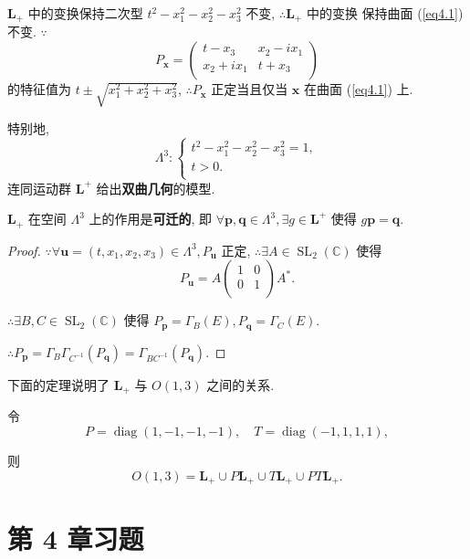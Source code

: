 \documentclass{ctexart}
\begin{document}
$\boldsymbol{L}_+$ 中的变换保持二次型 $t^2-x_1^2-x_2^2-x_3^2$ 不变, $\therefore\boldsymbol{L}_+$ 中的变换 保持曲面 (\ref{eq4.1}) 不变. $\because$
\[P_{\boldsymbol{x}}=\begin{pmatrix}
    t-x_3 & x_2-ix_1 \\
    x_2+ix_1 & t+x_3 \\
\end{pmatrix}\]
的特征值为 $t\pm\sqrt{x_1^2+x_2^2+x_3^2}$, $\therefore P_{\boldsymbol{x}}$ 正定当且仅当 $\boldsymbol{x}$ 在曲面 (\ref{eq4.1}) 上.

特别地, 
\[\Lambda^3:\begin{cases}
    t^2-x_1^2-x_2^2-x_3^2=1, \\
    t>0. \\
\end{cases}\]
连同运动群 $\boldsymbol{L}^+$ 给出\textbf{双曲几何}的模型.
\begin{theorem}
    $\boldsymbol{L}_+$ 在空间 $\Lambda^3$ 上的作用是\textbf{可迁的}, 即 $\forall\boldsymbol{p},\boldsymbol{q}\in\Lambda^3,\exists g\in\boldsymbol{L}^+$ 使得 $g\boldsymbol{p}=\boldsymbol{q}$.
\end{theorem}
\begin{proof}
    $\because\forall\boldsymbol{u}=(t,x_1,x_2,x_3)\in\Lambda^3,P_{\boldsymbol{u}}$ 正定, $\therefore\exists A\in\operatorname{SL}_2(\mathbb{C})$ 使得
    \[P_{\boldsymbol{u}}=A\begin{pmatrix}
        1 & 0 \\
        0 & 1 \\
    \end{pmatrix}A^*.\]

    $\therefore\exists B,C\in\operatorname{SL}_2(\mathbb{C})$ 使得 $P_{\boldsymbol{p}}=\Gamma_B(E),P_{\boldsymbol{q}}=\Gamma_C(E)$.

    $\therefore P_{\boldsymbol{p}}=\Gamma_B\Gamma_{C^{-1}}(P_{\boldsymbol{q}})=\Gamma_{BC^{-1}}(P_{\boldsymbol{q}})$.
\end{proof}
下面的定理说明了 $\boldsymbol{L}_+$ 与 $O(1,3)$ 之间的关系.
\begin{theorem}
    令
    \[P=\operatorname{diag}(1,-1,-1,-1),\quad T=\operatorname{diag}(-1,1,1,1),\]

    则
    \[O(1,3)=\boldsymbol{L}_+\cup P\boldsymbol{L}_+\cup T\boldsymbol{L}_+\cup PT\boldsymbol{L}_+.\]
\end{theorem}
\section{第 4 章习题}
\end{document}
